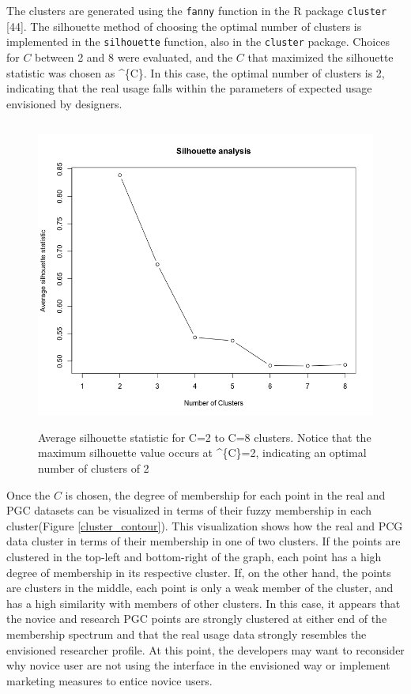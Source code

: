 \documentclass[]{article}
\begin{document}
The clusters are generated using the \texttt{fanny} function in the R
package \texttt{cluster} {[}44{]}. The silhouette method of choosing the
optimal number of clusters is implemented in the \texttt{silhouette}
function, also in the \texttt{cluster} package. Choices for \(C\)
between 2 and 8 were evaluated, and the \(C\) that maximized the
silhouette statistic was chosen as \^{}\{C\}. In this case, the optimal
number of clusters is 2, indicating that the real usage falls within the
parameters of expected usage envisioned by designers.

\begin{figure}[htbp]
\centering
\includegraphics[height=4.00000in]{./silhouette.png}
\caption{Average silhouette statistic for C=2 to C=8 clusters. Notice
that the maximum silhouette value occurs at \^{}\{C\}=2, indicating an
optimal number of clusters of 2 \label{silhouette_scree}}
\end{figure}

Once the \(C\) is chosen, the degree of membership for each point in the
real and PGC datasets can be visualized in terms of their fuzzy
membership in each cluster(Figure \ref{cluster_contour}). This
visualization shows how the real and PCG data cluster in terms of their
membership in one of two clusters. If the points are clustered in the
top-left and bottom-right of the graph, each point has a high degree of
membership in its respective cluster. If, on the other hand, the points
are clusters in the middle, each point is only a weak member of the
cluster, and has a high similarity with members of other clusters. In
this case, it appears that the novice and research PGC points are
strongly clustered at either end of the membership spectrum and that the
real usage data strongly resembles the envisioned researcher profile. At
this point, the developers may want to reconsider why novice user are
not using the interface in the envisioned way or implement marketing
measures to entice novice users.
\end{document}
